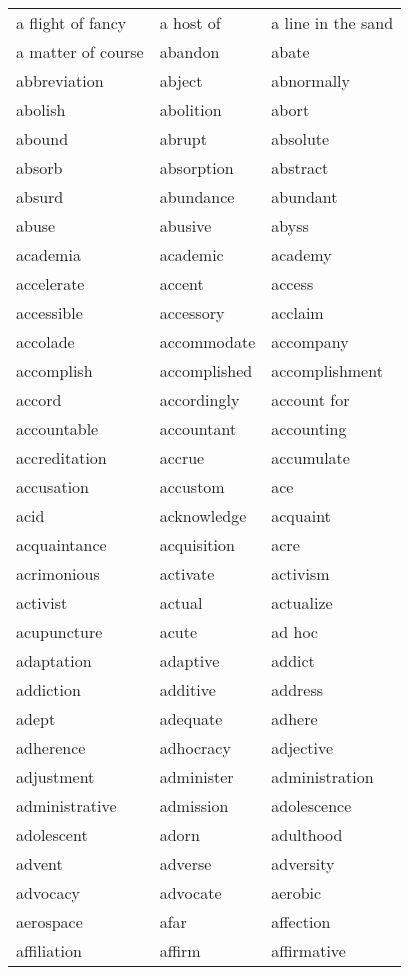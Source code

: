 \documentclass{minimal}
\begin{document}
\begin{longtable}{p{2.8cm}p{2.8cm}p{2.8cm}}
a flight of fancy & a host of & a line in the sand \\
a matter of course & abandon & abate \\
abbreviation & abject & abnormally \\
abolish & abolition & abort \\
abound & abrupt & absolute \\
absorb & absorption & abstract \\
absurd & abundance & abundant \\
abuse & abusive & abyss \\
academia & academic & academy \\
accelerate & accent & access \\
accessible & accessory & acclaim \\
accolade & accommodate & accompany \\
accomplish & accomplished & accomplishment \\
accord & accordingly & account for \\
accountable & accountant & accounting \\
accreditation & accrue & accumulate \\
accusation & accustom & ace \\
acid & acknowledge & acquaint \\
acquaintance & acquisition & acre \\
acrimonious & activate & activism \\
activist & actual & actualize \\
acupuncture & acute & ad hoc \\
adaptation & adaptive & addict \\
addiction & additive & address \\
adept & adequate & adhere \\
adherence & adhocracy & adjective \\
adjustment & administer & administration \\
administrative & admission & adolescence \\
adolescent & adorn & adulthood \\
advent & adverse & adversity \\
advocacy & advocate & aerobic \\
aerospace & afar & affection \\
affiliation & affirm & affirmative \\

\end{longtable}
\end{document}
